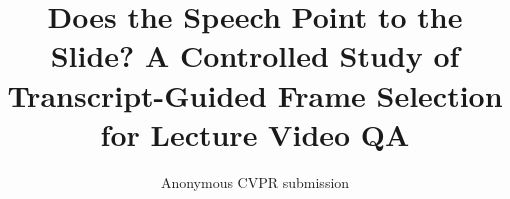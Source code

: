 \documentclass[10pt,twocolumn,letterpaper]{article}
\title{Does the Speech Point to the Slide? A Controlled Study of\\Transcript-Guided Frame Selection for Lecture Video QA}
\author{Anonymous CVPR submission}
\begin{document}
\maketitle







{
    \small
    
    
}
\end{document}
